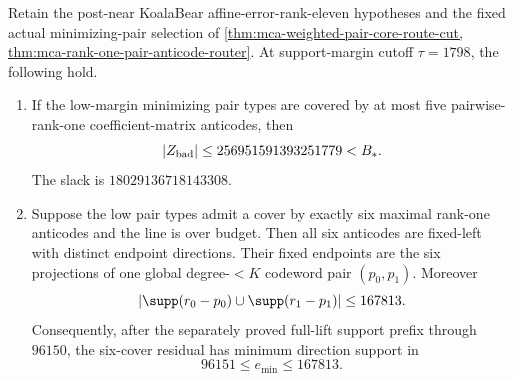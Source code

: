 \begin{theorem}
\label{thm:mca-rank11-six-anticode-router}
Retain the post-near KoalaBear affine-error-rank-eleven hypotheses and the
fixed actual minimizing-pair selection of
\cref{thm:mca-weighted-pair-core-route-cut,
       thm:mca-rank-one-pair-anticode-router}.
At support-margin cutoff \(\tau=1798\), the following hold.
\begin{enumerate}[label=\textup{(\roman*)}]
\item If the low-margin minimizing pair types are covered by at most five
pairwise-rank-one coefficient-matrix anticodes, then
\[
 |Z_{\rm bad}|\le256951591393251779<B_*.
\]
The slack is \(18029136718143308\).
\item Suppose the low pair types admit a cover by exactly six maximal
rank-one anticodes and the line is over budget.  Then all six anticodes are
fixed-left with distinct endpoint directions.  Their fixed endpoints are the
six projections of one global degree-\(<K\) codeword pair \((p_0,p_1)\).
Moreover
\[
 \left|\supp(r_0-p_0)\cup\supp(r_1-p_1)\right|\le167813.
\]
Consequently, after the separately proved full-lift support prefix through
\(96150\), the six-cover residual has minimum direction support in
\[
 96151\le e_{\min}\le167813.
\]
\end{enumerate}
\end{theorem}

